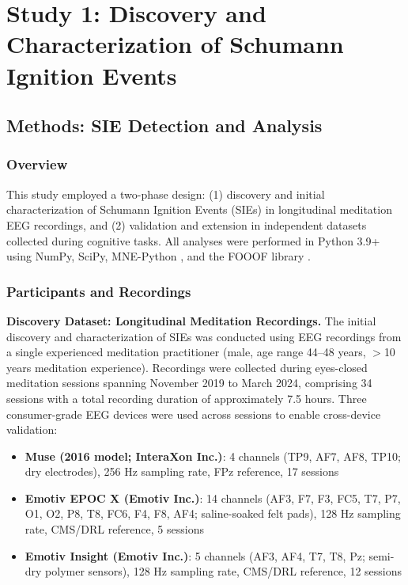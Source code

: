 \documentclass[11pt,a4paper]{article}
\begin{document}
\section{Study 1: Discovery and Characterization of Schumann Ignition Events}


\subsection{Methods: SIE Detection and Analysis}

\subsubsection{Overview}
This study employed a two-phase design: (1) discovery and initial characterization of Schumann Ignition Events (SIEs) in longitudinal meditation EEG recordings, and (2) validation and extension in independent datasets collected during cognitive tasks. All analyses were performed in Python 3.9+ using NumPy, SciPy, MNE-Python \parencite{harris2020numpy, virtanen2020scipy, gramfort2013mne}, and the FOOOF library \parencite{donoghue2020fooof}.

\subsubsection{Participants and Recordings}

\textbf{Discovery Dataset: Longitudinal Meditation Recordings.}
The initial discovery and characterization of SIEs was conducted using EEG recordings from a single experienced meditation practitioner (male, age range 44--48 years, $>$10 years meditation experience). Recordings were collected during eyes-closed meditation sessions spanning November 2019 to March 2024, comprising 34 sessions with a total recording duration of approximately 7.5 hours. Three consumer-grade EEG devices were used across sessions to enable cross-device validation:

\begin{itemize}
    \item \textbf{Muse (2016 model; InteraXon Inc.)}: 4 channels (TP9, AF7, AF8, TP10; dry electrodes), 256 Hz sampling rate, FPz reference, 17 sessions
    \item \textbf{Emotiv EPOC X (Emotiv Inc.)}: 14 channels (AF3, F7, F3, FC5, T7, P7, O1, O2, P8, T8, FC6, F4, F8, AF4; saline-soaked felt pads), 128 Hz sampling rate, CMS/DRL reference, 5 sessions
    \item \textbf{Emotiv Insight (Emotiv Inc.)}: 5 channels (AF3, AF4, T7, T8, Pz; semi-dry polymer sensors), 128 Hz sampling rate, CMS/DRL reference, 12 sessions
\end{itemize}
\end{document}
